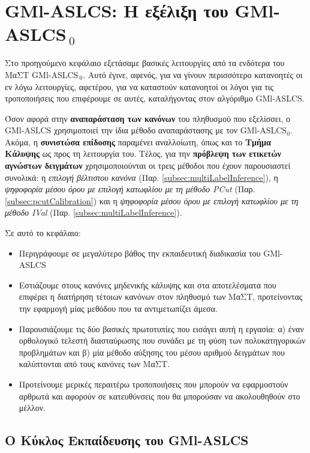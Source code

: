 \chapter{GMl-ASLCS: Η εξέλιξη του GMl-ASLCS$_{\:0}$}
\label{gmlaslcs}
Στο προηγούμενο κεφάλαιο εξετάσαμε βασικές λειτουργίες από τα ενδότερα του ΜαΣΤ GMl-ASLCS$_{\:0}$. Αυτό έγινε, αφενός, για να γίνουν περισσότερο κατανοητές οι εν λόγω λειτουργίες, αφετέρου, για να καταστούν κατανοητοί οι λόγοι για τις τροποποιήσεις που επιφέρουμε σε αυτές, καταλήγοντας στον αλγόριθμο GMl-ASLCS. 

Όσον αφορά στην \textbf{αναπαράσταση των κανόνων} του πληθυσμού που εξελίσσει, ο GMl-ASLCS χρησιμοποιεί την ίδια μέθοδο αναπαράστασης με τον GMl-ASLCS$_{0}$. Ακόμα, η \textbf{συνιστώσα επίδοσης} παραμένει αναλλοίωτη, όπως και το \textbf{Τμήμα Κάλυψης} ως προς τη λειτουργία του. Τέλος, για την \textbf{πρόβλεψη των ετικετών αγνώστων δειγμάτων} χρησιμοποιούνται οι τρεις μέθοδοι που έχουν παρουσιαστεί συνολικά: η \emph{επιλογή βέλτιστου κανόνα} (Παρ. \ref{subsec:multiLabelInference}), η \emph{ψηφοφορία μέσου όρου με επιλογή κατωφλίου με τη μέθοδο PCut} (Παρ. \ref{subsec:pcutCalibration}) και η \emph{ψηφοφορία μέσου όρου με επιλογή κατωφλίου με τη μέθοδο IVal} (Παρ. \ref{subsec:multiLabelInference}).

Σε αυτό το κεφάλαιο:
\begin{itemize}
\item Περιγράφουμε σε μεγαλύτερο βάθος την εκπαιδευτική διαδικασία του GMl-ASLCS
\item Εστιάζουμε στους κανόνες μηδενικής κάλυψης και στα αποτελέσματα που επιφέρει η διατήρηση τέτοιων κανόνων στον πληθυσμό των ΜαΣΤ, προτείνοντας την εφαρμογή μίας μεθόδου που τα αντιμετωπίζει άμεσα.
\item Παρουσιάζουμε τις δύο βασικές πρωτοτυπίες που εισάγει αυτή η εργασία: α) έναν ορθολογικό τελεστή διασταύρωσης που συνάδει με τη φύση των πολυκατηγορικών προβλημάτων και β) μία μέθοδο αύξησης του μέσου αριθμού δειγμάτων που καλύπτονται από τους κανόνες των ΜαΣΤ.
\item Προτείνουμε μερικές περαιτέρω τροποποιήσεις που μπορούν να εφαρμοστούν αρθρωτά και αφορούν σε κατευθύνσεις που θα μπορούσαν να ακολουθηθούν στο μέλλον.
\end{itemize}




\section{Ο Κύκλος Εκπαίδευσης του GMl-ASLCS}

